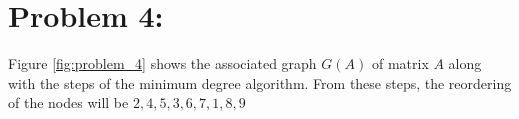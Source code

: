 \newpage
\section*{Problem 4:}

Figure \ref{fig:problem_4} shows the associated graph $G(A)$ of matrix $A$ along with the steps of the minimum degree algorithm. From these steps, the reordering of the nodes will be $2, 4, 5, 3, 6, 7, 1, 8, 9$



\begin{figure}[!tbh]
\centering        
    

\end{figure}
